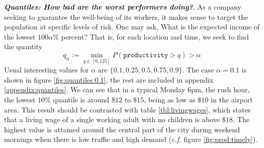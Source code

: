 \documentclass[a4paper, 11pt]{article}
\begin{document}
{\bfseries\itshape Quantiles: How bad are the worst performers doing?}. As a company seeking to guarantee the well-being of its workers, it makes sense to target the population at specific levels of risk. One may ask, What is the expected income of the lowest $100 \alpha\%$ percent? That is, for each location and time, we seek to find the quantity
$$
q_\alpha := \min_{q\in[0,125]}P(\mathtt{productivity} > q) > \alpha
$$
Usual interesting values for $\alpha$ are $\{0.1, 0.25, 0.5, 0.75, 0.9\}$. The case $\alpha = 0.1$ is shown in figure \ref{fig:quantiles:0.1}, the rest are included in appendix \ref{appendix:quantiles}. We can see that in a typical Monday 6pm, the rush hour, the lowest $10\%$ quantile is around $\$12$ to $\$15$, being as low as $\$10$ in the airport area. This result should be contrasted with table \ref{tbl:livingwages}, which states that a living wage of a single working adult with no children is above $\$18$. The highest value is attained around the central part of the city during weekend mornings when there is low traffic and high demand (\textit{c.f.} figure \ref{fig:prod:timely}).
\end{document}
